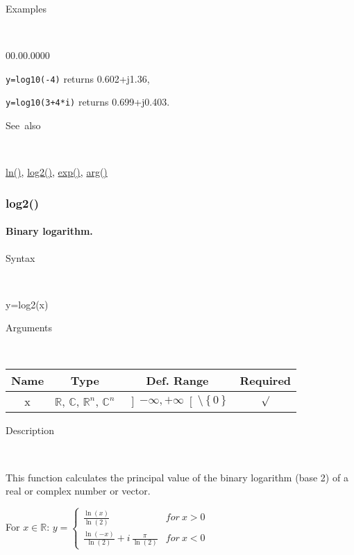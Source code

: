 \begin{description}
\item [Examples]~
\end{description}
\begin{lyxlist}{00.00.0000}
\item [\texttt{y=log10(-4)}]returns 0.602+j1.36,
\item [\texttt{y=log10(3+4{*}i)}]returns 0.699+j0.403.
\end{lyxlist}
\begin{description}
\item [See~also]~
\end{description}
\textcolor{blue}{\hyperlink{ln}{ln()}}\textcolor{black}{,} \textcolor{blue}{\hyperlink{log2}{log2()}}\textcolor{black}{,}
\textcolor{blue}{\hyperlink{exp}{exp()}}\textcolor{black}{,} \textcolor{blue}{\hyperlink{arg}{arg()}}


\newpage
\subsubsection*{\hypertarget{log2}{}{\Large log2()}}


\paragraph{\label{par:Binary-logarithm}Binary logarithm.}

\begin{description}
\item [Syntax]~
\end{description}
y=log2(x)

\begin{description}
\item [Arguments]~
\end{description}
\begin{tabular}{|c|c|c|c|}
\hline 
Name&
Type&
Def. Range&
Required\tabularnewline
\hline
\hline 
x&
$\mathbb{R}$, $\mathbb{C}$, $\mathbb{R}^{n}$, $\mathbb{C}^{n}$&
$\left]-\infty,+\infty\right[\setminus\left\{ 0\right\} $&
$\surd$\tabularnewline
\hline
\end{tabular}

\begin{description}
\item [Description]~
\end{description}
This function calculates the principal value of the binary logarithm
(base 2) of a real or complex number or vector.

\medskip{}
For $x\in\mathbb{R}$: $y=\left\{ \begin{array}{cc}
{\displaystyle \frac{\ln\left(x\right)}{\ln\left(2\right)}} & for\: x>0\\
{\displaystyle \frac{\ln\left(-x\right)}{\ln\left(2\right)}}+i\,{\displaystyle \frac{\pi}{\ln\left(2\right)}} & for\: x<0\end{array}\right.$

